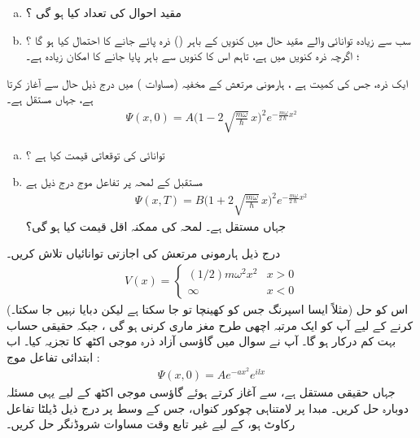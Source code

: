 \begin{enumerate}[a.]
\item
  مقید  احوال  کی تعداد کیا ہو گی ؟
\item 
 سب سے زیادہ توانائی والے مقید حال   میں کنویں کے باہر () ذرہ پائے جانے کا احتمال کیا ہو گا ؟
 ؛  اگرچہ ذرہ  کنویں میں   ہے، تاہم اس کا کنویں سے باہر پایا  جانے کا امکان زیادہ ہے۔ 
\end{enumerate}
ایک ذرہ،  جس کی کمیت ہے ، ہارمونی مرتعش کے مخفیہ (مساوات )  میں درج ذیل حال سے آغاز کرتا ہے،  جہاں   مستقل ہے۔
\begin{align*}
\Psi(x,0)=A\Big(1-2\sqrt{\frac{m\omega}{\hslash}}\, x \Big)^{2}e^{-\frac{m\omega}{2\hslash}x^{2}}
\end{align*}
%
\begin{enumerate}[a.]
\item
 توانائی کی توقعاتی قیمت کیا ہے ؟
\item
مستقبل کے لمحہ  پر تفاعل موج درج ذیل ہے
\begin{align*}
\Psi(x,T)=B\Big(1+2\sqrt{\frac{m\omega}{\hslash}}\,x \Big)^{2}e^{-\frac{m\omega}{2\hslash}x^{2}} 
\end{align*}
 جہاں    مستقل ہے۔ لمحہ  کی  ممکنہ اقل  قیمت کیا ہو گی؟ 
\end{enumerate}
درج ذیل   ہارمونی مرتعش کی اجازتی توانائیاں تلاش کریں۔
\begin{align*}
V(x)=
\begin{cases}
(1/2)m\omega^{2}x^{2}&x> 0\\
\infty & x< 0
\end{cases}
 \end{align*}
(مثلاً  ایسا اسپرنگ جس کو کھینچا تو جا سکتا ہے لیکن دبایا نہیں جا سکتا۔)  اس کو حل کرنے کے لیے آپ کو ایک مرتبہ  اچھی طرح مغز ماری کرنی ہو گی ، جبکہ حقیقی حساب بہت کم درکار ہو گا۔ 
آپ نے سوال  میں  گاؤسی آزاد ذرہ موجی اکٹھ کا تجزیہ کیا۔ اب ابتدائی تفاعل موج :
\begin{align*}
\Psi(x,0)=Ae^{-ax^{2}}e^{ilx} 
\end{align*} 
 جہاں   حقیقی مستقل ہے،  سے آغاز کرتے ہوئے   گاؤسی موجی اکٹھ کے لیے یہی مسئلہ دوبارہ حل کریں۔
مبدا پر لامتناہی چوکور کنواں، جس کے وسط پر درج ذیل ڈیلٹا تفاعل رکاوٹ ہو، کے لیے غیر تابع وقت مساوات شروڈنگر حل کریں۔
